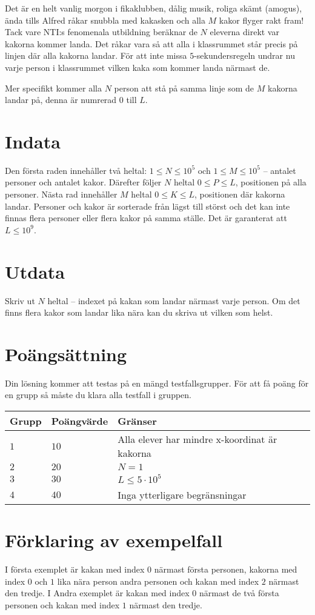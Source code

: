 Det är en helt vanlig morgon i fikaklubben, dålig musik, roliga skämt (amogus), ända tills Alfred råkar snubbla med kakasken och alla $M$ kakor flyger rakt fram!
Tack vare NTI:s fenomenala utbildning beräknar de $N$ eleverna direkt var kakorna kommer landa. Det råkar vara så att alla i klassrummet står precis på linjen där alla kakorna landar.
För att inte missa $5$-sekundersregeln undrar nu varje person i klassrummet vilken kaka som kommer landa närmast de. 

Mer specifikt kommer alla $N$ person att stå på samma linje som de $M$ kakorna landar på, denna är numrerad $0$ till $L$.


\section*{Indata}
Den första raden innehåller två heltal: $1\leq N \leq 10^5$ och $1 \leq M \leq 10^5$ -- antalet personer och antalet kakor. 
Därefter följer $N$ heltal $0 \leq P \leq L$, positionen på alla personer.
Nästa rad innehåller $M$ heltal $0 \leq K \leq L$, positionen där kakorna landar.
Personer och kakor är sorterade från lägst till störst och det kan inte finnas flera personer eller flera kakor på samma ställe.
Det är garanterat att $L \leq 10^9$.

\section*{Utdata}
Skriv ut $N$ heltal -- indexet på kakan som landar närmast varje person. Om det finns flera kakor som landar lika nära kan du skriva ut vilken som helst.

\section*{Poängsättning}
Din lösning kommer att testas på en mängd testfallsgrupper.
För att få poäng för en grupp så måste du klara alla testfall i gruppen.

\noindent
\begin{tabular}{| l | l | p{12cm} |}
  \hline
  Grupp & Poängvärde & Gränser \\ \hline
  $1$   & $10$       & Alla elever har mindre x-koordinat är kakorna \\ \hline
  $2$   & $20$       & $N=1$ \\ \hline
  $3$   & $30$       & $L \leq 5\cdot 10^5$ \\ \hline
  $4$   & $40$       & Inga ytterligare begränsningar  \\ \hline
\end{tabular}

\section*{Förklaring av exempelfall}
I första exemplet är kakan med index $0$ närmast första personen, kakorna med index $0$ och $1$ lika nära person andra personen och kakan med index $2$ närmast den tredje.
I Andra exemplet är kakan med index $0$ närmast de två första personen och kakan med index $1$ närmast den tredje.
